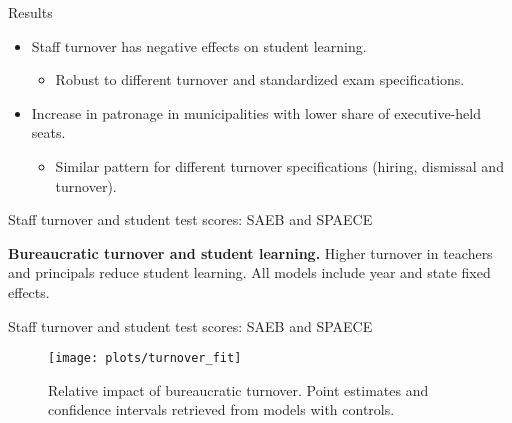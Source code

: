 \documentclass[ignorenonframetext,]{beamer}
\providecommand{\tightlist}{%
  \setlength{\itemsep}{0pt}\setlength{\parskip}{0pt}}
\begin{document}
\begin{frame}{Results}
\protect\hypertarget{results}{}

\begin{itemize}
\tightlist
\item
  Staff turnover has negative effects on student learning.

  \begin{itemize}
  \tightlist
  \item
    Robust to different turnover and standardized exam specifications.
  \end{itemize}
\item
  Increase in patronage in municipalities with lower share of
  executive-held seats.

  \begin{itemize}
  \tightlist
  \item
    Similar pattern for different turnover specifications (hiring,
    dismissal and turnover).
  \end{itemize}
\end{itemize}

\end{frame}

\begin{frame}{Staff turnover and student test scores: SAEB and SPAECE}
\protect\hypertarget{staff-turnover-and-student-test-scores-saeb-and-spaece}{}

\begin{table}[t]
  \centering
  \resizebox*{!}{\height}{%
  }
  \caption{\textbf{Bureaucratic turnover and student learning.} Higher turnover in teachers and principals reduce student learning. All models include year and state fixed effects.}
  \label{tbl:hlm_mods}
\end{table}

\end{frame}

\begin{frame}{Staff turnover and student test scores: SAEB and SPAECE}
\protect\hypertarget{staff-turnover-and-student-test-scores-saeb-and-spaece-1}{}

\begin{figure}

{\centering \texttt{[image: plots/turnover\_fit]} 

}

\caption{Relative impact of bureaucratic turnover. Point estimates and confidence intervals retrieved from models with controls.}\label{fig:unnamed-chunk-5}
\end{figure}

\end{frame}
\end{document}
